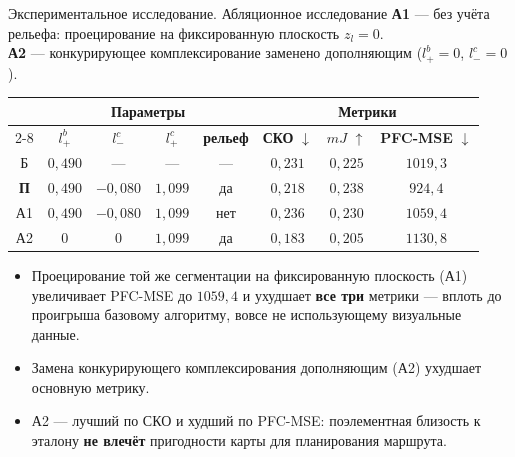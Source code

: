 \begin{frame}{Экспериментальное исследование. Абляционное исследование}
	\footnotesize
	\textbf{А1} --- без учёта рельефа: проецирование на фиксированную плоскость $z_l = 0$.\\
	\textbf{А2} --- конкурирующее комплексирование заменено дополняющим ($l^b_+ = 0$, $l^c_- = 0$).

	\begin{table}
		\footnotesize
		\centering
		\begin{tabular}{|c|c|c|c|c||c|c|c|}
			\hline
			& \multicolumn{4}{c||}{\textbf{Параметры}} & \multicolumn{3}{c|}{\textbf{Метрики}} \\
			\cline{2-8}
			& \boldmath$l^b_+$ & \boldmath$l^c_-$ & \boldmath$l^c_+$ & \textbf{рельеф} & \textbf{СКО} \tiny$\downarrow$ & \boldmath$mJ$ \tiny$\uparrow$ & \textbf{PFC-MSE} \tiny$\downarrow$ \\
			\hline
			Б & $0,490$ & --- & --- & --- & $0,231$ & $0,225$ & $1019,3$ \\
			\hline
			\textbf{П} & $0,490$ & $-0,080$ & $1,099$ & да & $0,218$ & \boldmath$0,238$ & \boldmath$924,4$ \\
			\hline
			А1 & $0,490$ & $-0,080$ & $1,099$ & нет & $0,236$ & $0,230$ & $1059,4$ \\
			\hline
			А2 & $0$ & $0$ & $1,099$ & да & \boldmath$0,183$ & $0,205$ & $1130,8$ \\
			\hline
		\end{tabular}
	\end{table}

	\begin{itemize}
		\item Проецирование той же сегментации на фиксированную плоскость (А1) увеличивает PFC-MSE до $1059,4$ и ухудшает \textbf{все три} метрики --- вплоть до проигрыша базовому алгоритму, вовсе не использующему визуальные данные.
		\item Замена конкурирующего комплексирования дополняющим (А2) ухудшает основную метрику.
		\item А2 --- лучший по СКО и худший по PFC-MSE: поэлементная близость к эталону \textbf{не влечёт} пригодности карты для планирования маршрута.
	\end{itemize}
\end{frame}




